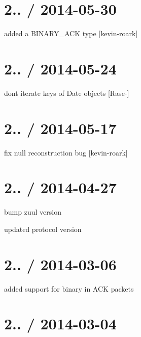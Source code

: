 \section*{2.. / 2014-\/05-\/30 }


\begin{DoxyItemize}
\item added a B\+I\+N\+A\+R\+Y\+\_\+\+A\+CK type \mbox{[}kevin-\/roark\mbox{]}
\end{DoxyItemize}

\section*{2.. / 2014-\/05-\/24 }


\begin{DoxyItemize}
\item don\textquotesingle{}t iterate keys of {\ttfamily Date} objects \mbox{[}Rase-\/\mbox{]}
\end{DoxyItemize}

\section*{2.. / 2014-\/05-\/17 }


\begin{DoxyItemize}
\item fix null reconstruction bug \mbox{[}kevin-\/roark\mbox{]}
\end{DoxyItemize}

\section*{2.. / 2014-\/04-\/27 }


\begin{DoxyItemize}
\item bump zuul version
\item updated protocol version
\end{DoxyItemize}

\section*{2.. / 2014-\/03-\/06 }


\begin{DoxyItemize}
\item added support for binary in A\+CK packets
\end{DoxyItemize}

\section*{2.. / 2014-\/03-\/04 }


